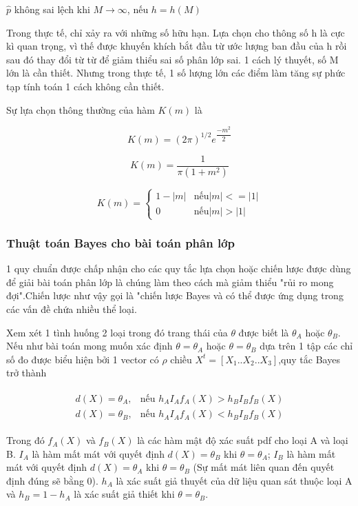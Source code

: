 $\hat{p}$  không sai lệch khi $M \rightarrow \infty$, nếu $h=h(M)$

Trong thực tế, chỉ xảy ra với những số hữu hạn. Lựa chọn cho thông số h là cực kì quan trọng, vì thế được khuyến khích bắt đầu từ ước lượng ban đầu của h rồi sau đó thay đổi từ từ để giảm thiểu sai số phân lớp sai. 1 cách lý thuyết, số M lớn là cần thiết. Nhưng trong thực tế, 1 số lượng lớn các điểm làm tăng sự phức tạp tính toán 1 cách không cần thiết.

Sự lựa chọn thông thường của hàm $K(m)$ là

\begin{equation}
	K(m)=(2\pi)^{1/2}e^{\dfrac{-m^2}{2}}
\end{equation}

\begin{equation}
	K(m)=\dfrac{1}{\pi (1+m^2)}
\end{equation}

$$
K(m)=
\begin{cases}
	1-|m| & \text{nếu} |m|<=|1|\\
	0 & \text{nếu} |m|>|1|
\end{cases}
$$

\subsubsection{Thuật toán Bayes cho bài toán phân lớp}
1 quy chuẩn được chấp nhận cho các quy tắc lựa chọn hoặc chiến lược được dùng để giải bài toán phân lớp là chúng làm theo cách mà giảm thiểu "rủi ro mong đợi".Chiến lược như vậy gọi là "chiến lược Bayes và có thể được ứng dụng trong các vấn đề chứa nhiều thể loại. 

Xem xét 1 tình huống 2 loại trong đó trang thái của $\theta$ được biết là $\theta_A$ hoặc $\theta_B$. Nếu như bài toán mong muốn xác định $\theta = \theta_A$ hoặc $\theta = \theta_B$ dựa trên 1 tập các chỉ số đo được biểu hiện bởi 1 vector có $\rho$ chiều $X^t = [X_1..X_2..X_3]$,quy tắc Bayes trở thành \cite{bay}

\begin{align}
	\begin{split}
		d(X) = \theta_A , & \text{nếu $h_A I_A f_A (X) > h_B I_B f_B (X)$} \\
		d(X) = \theta_B , & \text{nếu $h_A I_A f_A (X) < h_B I_B f_B (X)$}
	\end{split}
\end{align}

Trong đó $f_A (X)$ và $f_B (X)$ là các hàm mật độ xác suất \ac{pdf} cho loại A và loại B. $I_A$ là hàm mất mát với quyết định $d(X) = \theta_B$ khi $\theta = \theta_A$; $I_B$ là hàm mất mát với quyết định $d(X)= \theta_A$ khi $\theta = \theta_B$ (Sự mất mát liên quan đến quyết định đúng sẽ bằng 0). $h_A$ là xác suất giả thuyết của dữ liệu quan sát thuộc loại A và $h_B=1-h_A$ là xác suất giả thiết khi $\theta = \theta_B$.


